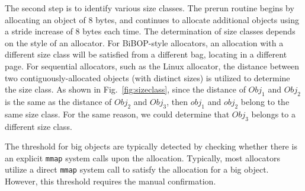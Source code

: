 The second step is to identify various size classes. The prerun routine begins by allocating an object of 8 bytes, and continues to allocate additional objects using a stride increase of 8 bytes each time. The determination of size classes depends on the style of an allocator. For BiBOP-style allocators, an allocation with a different size class will be satisfied from a different bag, locating in a different page. For sequential allocators, such as the Linux allocator, the distance between two  contiguously-allocated objects (with distinct sizes) is utilized to determine the size class. As shown in Fig.~\ref{fig:sizeclass}, since the distance of $Obj_1$ and $Obj_2$ is the same as the distance of $Obj_2$ and $Obj_3$, then $obj_1$ and $obj_2$ belong to the same size class. For the same reason, we could determine that $Obj_3$ belongs to a different size class.  

The threshold for big objects are typically detected by checking whether there is an explicit \texttt{mmap} system calls upon the allocation. Typically, most allocators utilize a direct \texttt{mmap} system call to satisfy the allocation for a big object. However, this threshold requires the manual confirmation. 



